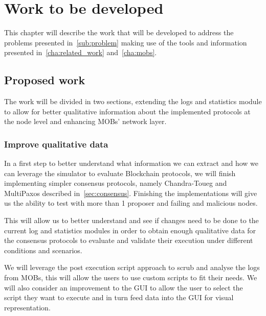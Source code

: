 
%

\chapter{Work to be developed}\label{cha:work_to_be_developed}

This chapter will describe the work that will be developed to address the
problems presented in~\ref{sub:problem} making use of the tools and information
presented in~\ref{cha:related_work} and~\ref{cha:mobs}.

\section{Proposed work}\label{sub:sub_proposed_work}

The work will be divided in two sections, extending the logs and statistics 
module to allow for better qualitative
information about the implemented protocols at the node level and enhancing MOBs' network layer.

\subsection{Improve qualitative data}\label{subsec:improve_qualitative_data}

In a first step to better understand what information we can extract and how
we can leverage the simulator to evaluate Blockchain protocols, we will finish implementing
simpler consensus protocols, namely Chandra-Toueg and MultiPaxos described in~\ref{sec:consensus}.
Finishing the implementations will give us the ability to test with more than 1 proposer and
failing and malicious nodes.

This will allow us to better understand and see if changes
need to be done to the current log and statistics modules in order to obtain enough qualitative
data for the consensus protocols to evaluate and validate their execution under different
conditions and scenarios.

We will leverage the post execution script approach to scrub and analyse the logs from MOBs,
this will allow the users to use custom scripts to fit their needs. We will also consider an
improvement to the GUI to allow the user to select the script they want to execute and in turn
feed data into the GUI for visual representation.

